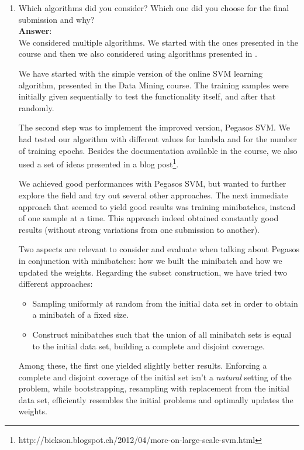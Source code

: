 \documentclass[11pt]{article}
\begin{document}
\begin{enumerate}
\item Which algorithms did you consider? Which one did you choose for the
  final submission and why? \\
  
\textbf{Answer}: \\
We considered multiple algorithms. We started with the
ones presented in the course and then we also considered using
algorithms presented in \cite{Sculley09}.

We have started with the simple version of the online SVM learning
algorithm, presented in the Data Mining course. The training samples
were initially given sequentially to test the functionality itself, and
after that randomly.

The second step was to implement the improved version, Pegasos SVM. We
had tested our algorithm with different values for lambda and for the number 
of training epochs. 
Besides the documentation available in the course, we also used
a set of ideas presented in a blog post\footnote{
http://bickson.blogspot.ch/2012/04/more-on-large-scale-svm.html}.

We achieved good performances with Pegasos SVM, but wanted to further
explore the field and try out several other approaches. The next
immediate approach that seemed to yield good results was training
minibatches, instead of one sample at a time. This approach indeed
obtained constantly good results (without strong variations from one
submission to another).

Two aspects are relevant to consider and evaluate when talking about
Pegasos in conjunction with minibatches: how we built the minibatch and
how we updated the weights. Regarding the subset construction, we have
tried two different approaches:
\begin{itemize}
\item{Sampling uniformly at random from the initial data set in order
to obtain a minibatch of a fixed size.}
\item{Construct minibatches such that the union of all minibatch sets 
is equal to the initial data set, building a complete and disjoint coverage.}
\end{itemize}

Among these, the first one yielded slightly better results. Enforcing a
complete and disjoint coverage of the initial set isn't a \emph{natural}
setting of the problem, while bootstrapping, resampling with replacement
from the initial data set, efficiently resembles the initial problems
and optimally updates the weights.


\end{enumerate}
\end{document}
